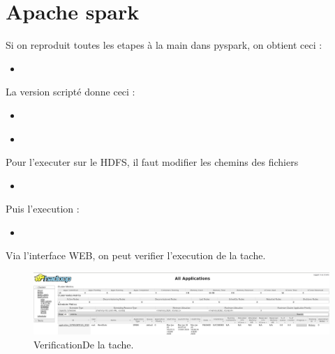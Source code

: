 \documentclass[10pt,a4paper]{article}
\newcommand{\insertcode}[2]{\begin{itemize}\item[]\end{itemize}}
\begin{document}
\section{Apache spark }
Si on reproduit toutes les etapes à la main dans pyspark, on obtient ceci :
\insertcode{commande/14.txt}{pyspark}

La version scripté donne ceci :
\insertcode{commande/wordStat.py}{wordStat.py}
\insertcode{commande/wordStat.txt}{Execution du script}

Pour l'executer sur le HDFS, il faut modifier les chemins des fichiers
\insertcode{commande/wordStatHDFS.py}{wordStatHDFS.py}
Puis l'execution :
\insertcode{commande/wordStatHDFS.txt}{STDOUT et Preuve}
Via l'interface WEB, on peut verifier l'execution de la tache.
\begin{figure}[h!]
\centering
\includegraphics[scale=0.270]{image/4.jpg}
\caption{VerificationDe la tache. }
\label{fig:net }
\end{figure}
\end{document}
